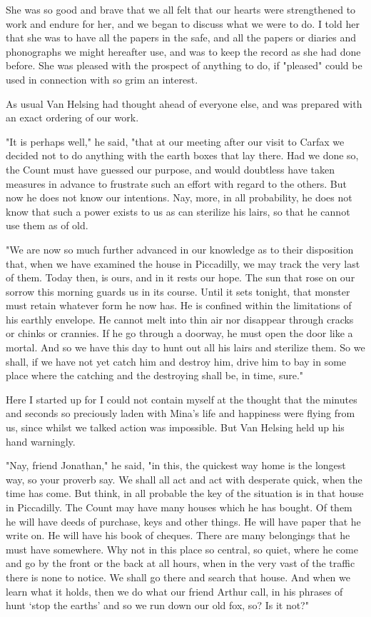 She was so good and brave that we all felt that our hearts were strengthened to work and endure for her, and we began to discuss what we were to do. I told her that she was to have all the papers in the safe, and all the papers or diaries and phonographs we might hereafter use, and was to keep the record as she had done before. She was pleased with the prospect of anything to do, if "pleased" could be used in connection with so grim an interest. 

As usual Van Helsing had thought ahead of everyone else, and was prepared with an exact ordering of our work. 

"It is perhaps well," he said, "that at our meeting after our visit to Carfax we decided not to do anything with the earth boxes that lay there. Had we done so, the Count must have guessed our purpose, and would doubtless have taken measures in advance to frustrate such an effort with regard to the others. But now he does not know our intentions. Nay, more, in all probability, he does not know that such a power exists to us as can sterilize his lairs, so that he cannot use them as of old. 

"We are now so much further advanced in our knowledge as to their disposition that, when we have examined the house in Piccadilly, we may track the very last of them. Today then, is ours, and in it rests our hope. The sun that rose on our sorrow this morning guards us in its course. Until it sets tonight, that monster must retain whatever form he now has. He is confined within the limitations of his earthly envelope. He cannot melt into thin air nor disappear through cracks or chinks or crannies. If he go through a doorway, he must open the door like a mortal. And so we have this day to hunt out all his lairs and sterilize them. So we shall, if we have not yet catch him and destroy him, drive him to bay in some place where the catching and the destroying shall be, in time, sure." 

Here I started up for I could not contain myself at the thought that the minutes and seconds so preciously laden with Mina's life and happiness were flying from us, since whilst we talked action was impossible. But Van Helsing held up his hand warningly. 

"Nay, friend Jonathan," he said, "in this, the quickest way home is the longest way, so your proverb say. We shall all act and act with desperate quick, when the time has come. But think, in all probable the key of the situation is in that house in Piccadilly. The Count may have many houses which he has bought. Of them he will have deeds of purchase, keys and other things. He will have paper that he write on. He will have his book of cheques. There are many belongings that he must have somewhere. Why not in this place so central, so quiet, where he come and go by the front or the back at all hours, when in the very vast of the traffic there is none to notice. We shall go there and search that house. And when we learn what it holds, then we do what our friend Arthur call, in his phrases of hunt `stop the earths' and so we run down our old fox, so? Is it not?" 

